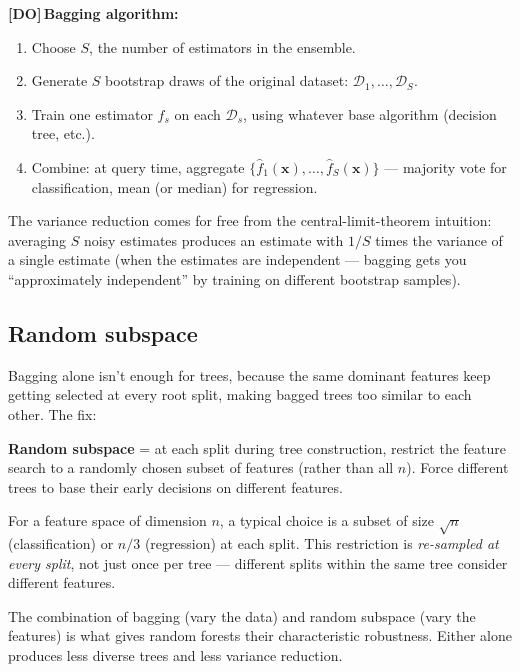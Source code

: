 \documentclass[11pt, a4paper]{article}
\newcommand{\doflag}{\textcolor{defBd}{\textbf{[DO]}}\,}
\begin{document}
\doflag{}\textbf{Bagging algorithm:}
\begin{enumerate}
  \item Choose $S$, the number of estimators in the ensemble.
  \item Generate $S$ bootstrap draws of the original dataset: $\mathcal{D}_1, \ldots, \mathcal{D}_S$.
  \item Train one estimator $\hat{f}_s$ on each $\mathcal{D}_s$, using whatever base algorithm (decision tree, etc.).
  \item Combine: at query time, aggregate $\{\hat{f}_1(\mathbf{x}), \ldots, \hat{f}_S(\mathbf{x})\}$ — majority vote for classification, mean (or median) for regression.
\end{enumerate}

The variance reduction comes for free from the central-limit-theorem intuition: averaging $S$ noisy estimates produces an estimate with $1/S$ times the variance of a single estimate (when the estimates are independent — bagging gets you ``approximately independent'' by training on different bootstrap samples).

\subsection{Random subspace}

Bagging alone isn't enough for trees, because the same dominant features keep getting selected at every root split, making bagged trees too similar to each other. The fix:

\begin{defbox}
\textbf{Random subspace} = at each split during tree construction, restrict the feature search to a randomly chosen subset of features (rather than all $n$). Force different trees to base their early decisions on different features.
\end{defbox}

For a feature space of dimension $n$, a typical choice is a subset of size $\sqrt{n}$ (classification) or $n/3$ (regression) at each split. This restriction is \emph{re-sampled at every split}, not just once per tree — different splits within the same tree consider different features.

\begin{notebox}
The combination of bagging (vary the data) and random subspace (vary the features) is what gives random forests their characteristic robustness. Either alone produces less diverse trees and less variance reduction.
\end{notebox}
\end{document}
